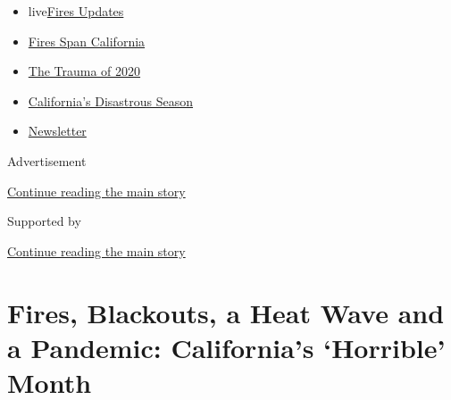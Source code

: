 \begin{itemize}
\tightlist
\item
  live\href{https://www.nytimes3xbfgragh.onion/2020/09/09/us/wildfires-live-updates.html?name=styln-california-wildfires\&region=TOP_BANNER\&block=storyline_menu_recirc\&action=click\&pgtype=Article\&impression_id=8a6d9061-f2b5-11ea-9df0-4b0f68b7e02f\&variant=undefined}{Fires
  Updates}
\item
  \href{https://www.nytimes3xbfgragh.onion/2020/09/07/us/ca-wildfires-heatwave.html?name=styln-california-wildfires\&region=TOP_BANNER\&block=storyline_menu_recirc\&action=click\&pgtype=Article\&impression_id=8a6d9062-f2b5-11ea-9df0-4b0f68b7e02f\&variant=undefined}{Fires
  Span California}
\item
  \href{https://www.nytimes3xbfgragh.onion/2020/08/26/us/california-wildfires-lake-berryessa.html?name=styln-california-wildfires\&region=TOP_BANNER\&block=storyline_menu_recirc\&action=click\&pgtype=Article\&impression_id=8a6db770-f2b5-11ea-9df0-4b0f68b7e02f\&variant=undefined}{The
  Trauma of 2020}
\item
  \href{https://www.nytimes3xbfgragh.onion/article/why-does-california-have-wildfires.html?name=styln-california-wildfires\&region=TOP_BANNER\&block=storyline_menu_recirc\&action=click\&pgtype=Article\&impression_id=8a6db771-f2b5-11ea-9df0-4b0f68b7e02f\&variant=undefined}{California's
  Disastrous Season}
\item
  \href{https://www.nytimes3xbfgragh.onion/2020/09/08/us/california-wildfire-heat-wave.html?name=styln-california-wildfires\&region=TOP_BANNER\&block=storyline_menu_recirc\&action=click\&pgtype=Article\&impression_id=8a6db772-f2b5-11ea-9df0-4b0f68b7e02f\&variant=undefined}{Newsletter}
\end{itemize}

Advertisement

\protect\hyperlink{after-top}{Continue reading the main story}

Supported by

\protect\hyperlink{after-sponsor}{Continue reading the main story}

\hypertarget{fires-blackouts-a-heat-wave-and-a-pandemic-californias-horrible-month}{%
\section{Fires, Blackouts, a Heat Wave and a Pandemic: California's
`Horrible'
Month}\label{fires-blackouts-a-heat-wave-and-a-pandemic-californias-horrible-month}}

